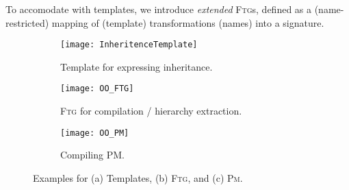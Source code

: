 To accomodate with templates, we introduce \emph{extended} \textsc{Ftg}s, 
defined as a (name-restricted) mapping of (template) transformations (names) 
into a signature.

\begin{figure}
\centering
\begin{subfigure}[t]{0.3\linewidth}
\centering
\texttt{[image: InheritenceTemplate]}
\caption{Template for expressing inheritance.}
  \label{fig:InheritenceTemplate}
\end{subfigure}
\begin{subfigure}[t]{0.35\linewidth}
\centering
\texttt{[image: OO\_FTG]}
\caption{\textsc{Ftg} for compilation / hierarchy extraction.}
\label{fig:OO_FTG}
\end{subfigure}
\begin{subfigure}[t]{0.3\linewidth}
\centering
\texttt{[image: OO\_PM]}
\caption{Compiling \textsc{PM}.}
\label{fig:OO_PM}
\end{subfigure}
\caption{Examples for (a) Templates, (b) \textsc{Ftg}, and (c) \textsc{Pm}.}
\end{figure}



